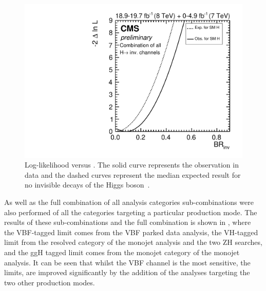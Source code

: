 \begin{figure}
  \includegraphics[width=\largefigwidth]{plots/comb/HIG-15-012-figs/combscan.pdf}
  \caption{Log-likelihood versus \BRinv. The solid curve represents the observation in data and the dashed curves represent the median expected result for no invisible decays of the Higgs boson~\cite{CMS-PAS-HIG-15-012}.}
  \label{fig:parkedcombscan}
\end{figure}

As well as the full combination of all analysis categories sub-combinations were also performed of all the categories targeting a particular production mode. The results of these sub-combinations and the full combination is shown in , where the \ac{VBF}-tagged limit comes from the \ac{VBF} parked data analysis, the \ac{VH}-tagged limit from the resolved category of the monojet analysis and the two ZH searches, and the \ac{ggH} tagged limit comes from the monojet category of the monojet analysis. It can be seen that whilst the \ac{VBF} channel is the most sensitive, the limits, are improved significantly by the addition of the analyses targeting the two other production modes.

